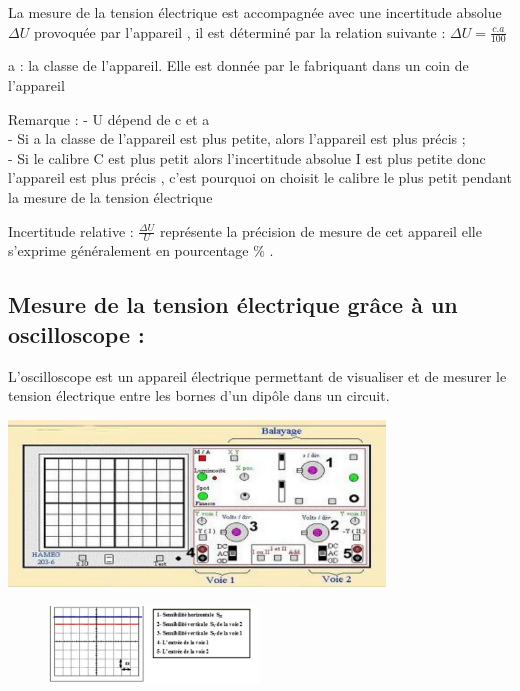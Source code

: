 \documentclass[12pt]{article}
\begin{document}
La mesure de la tension électrique est accompagnée avec une
incertitude absolue $\Delta{U}$ provoquée par l’appareil , il est déterminé par la
relation suivante : $\Delta{U} = \frac{c.a}{100}$

a : la classe de l’appareil. Elle est donnée par le fabriquant dans un coin de l’appareil

\begin{tcolorbox}{Remarque : }
- U dépend de c et a
\\- Si a la classe de l’appareil est plus petite, alors l’appareil est plus précis ;
\\- Si le calibre C est plus petit alors l’incertitude absolue I est plus petite donc l’appareil est plus précis , c’est pourquoi on choisit le calibre le plus petit pendant la mesure de la tension électrique

    Incertitude relative : $\frac{\Delta{U}}{U}$ représente la précision de mesure de cet appareil elle s’exprime généralement en pourcentage \% .
\end{tcolorbox}

\subsection{Mesure de la tension électrique grâce à un oscilloscope : }
L'oscilloscope est un appareil électrique permettant de visualiser et de mesurer le tension électrique entre
les bornes d’un dipôle dans un circuit.

\begin{center}
  \includegraphics[width=0.75\textwidth]{./img/img_oscilloscope_01.png}


\end{center}
\begin{figure}
    \vspace{-1cm}
\includegraphics[width=0.5\textwidth]{./img/img_tension_u_02.png}
\end{figure}
\end{document}
